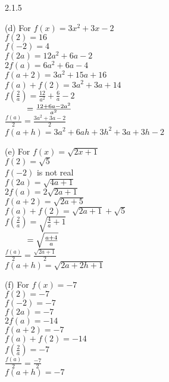 \begin{Answer}{2.1.5}
\vspace{2mm}

(d) \hspace{2mm} For $f(x) = 3x^2+3x-2$\\
$f(2) = 16$\\
$f(-2) = 4$\\
$f(2a) = 12a^2+6a-2$\\
$2 f(a) = 6a^2+6a-4$\\
$f(a+2) = 3a^2+15a+16$\\
\small $f(a) + f(2) = 3a^2+3a+14$ \normalsize\\
$f \left( \frac{2}{a} \right) = \frac{12}{a^2} + \frac{6}{a} - 2$ \\
$\hphantom{f \left( \frac{2}{a} \right)} = \frac{12+6a-2a^2}{a^2}$\\
$\frac{f(a)}{2} =  \frac{3a^2+3a-2}{2}$\\
$f(a + h) = 3a^2 + 6ah + 3h^2+3a+3h-2$\\

\vspace{3mm}

(e) \hspace{2mm} For $f(x) = \sqrt{2x+1}$\\
$f(2) = \sqrt{5}$\\
$f(-2)$ is not real \\
$f(2a) = \sqrt{4a+1}$\\
$2 f(a) = 2\sqrt{2a+1}$\\
$f(a+2) = \sqrt{2a+5}$\\
\small $f(a) + f(2) =\sqrt{2a+1} + \sqrt{5}$ \normalsize\\
$f \left( \frac{2}{a} \right) = \sqrt{\frac{4}{a} + 1}$ \\
$\hphantom{f \left( \frac{2}{a} \right)} = \sqrt{\frac{a+4}{a}}$\\
$\frac{f(a)}{2} = \frac{\sqrt{2a+1}}{2}$\\
$f(a + h) = \sqrt{2a+2h+1}$\\

\vspace{3mm}

(f) \hspace{2mm}  For $f(x) = -7$\\
$f(2) = -7$\\
$f(-2) = -7$\\
$f(2a) = -7$\\
$2 f(a) = -14$\\
$f(a+2) = -7$\\
$f(a) + f(2) = -14$\\
$f \left( \frac{2}{a} \right) = -7$ \\
$\frac{f(a)}{2} = \frac{-7}{2}$\\
$f(a + h) = -7$\\


\end{Answer}
